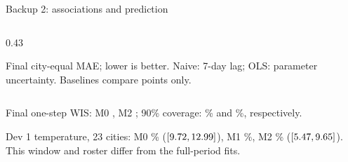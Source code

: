 \documentclass[aspectratio=169,11pt]{beamer}
\begin{document}
\begin{frame}{Backup 2: associations and prediction}
\begin{columns}[T,onlytextwidth]
\begin{column}{0.43\textwidth}
      \par\vspace{0.04cm}
      Final city-equal MAE; lower is better. Naive: 7-day lag; OLS: parameter uncertainty.
      Baselines compare points only.
    \end{column}
  \end{columns}
  \vspace{0.04cm}
  Final one-step WIS: M0 \MZeroFinalStepWis{}, M2 \MTwoFinalStepWis{};
  90\% coverage: \MZeroFinalStepCov\% and \MTwoFinalStepCov\%, respectively.
  \par\vspace{0.04cm}
  Dev 1 temperature, 23 cities: M0
  \TempMZeroDevOneMed\% ($[9.72,12.99]$), M1 \TempMOneDevOneMed\%, M2
  \TempMTwoDevOneMed\% ($[5.47,9.65]$).
  This window and roster differ from the full-period fits.
\end{frame}
\end{document}
